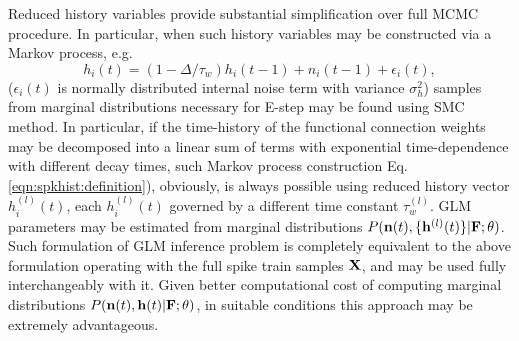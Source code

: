 Reduced history variables provide substantial simplification over full MCMC procedure. In particular, when such history variables may be constructed via a Markov process, e.g.
\begin{equation}\label{eqn:spkhist:definition}
h_i(t)=(1-\Delta/\tau_w) h_i(t-1) + n_i(t-1) + \epsilon_i(t), 
\end{equation}
($\epsilon_i(t)$ is normally distributed internal noise term with variance $\sigma^2_h$) samples from marginal distributions necessary for E-step may be found using SMC method. In particular, if the time-history of the  functional connection weights may be decomposed into a linear sum of  terms with exponential time-dependence with different decay times, such Markov process construction Eq. \eqref{eqn:spkhist:definition}), obviously, is always possible using reduced history vector $h_i^{(l)}(t)$, each $h_i^{(l)}(t)$ governed by a different time constant $\tau^{(l)}_w$. GLM parameters may be estimated from marginal distributions $P({\bf n}(t), \{{\bf h}^{(l)}(t)\}|{\bf F};\mathbf{\theta})$.  Such formulation of GLM inference problem is completely equivalent to the above formulation operating with the full spike train samples ${\bf X}$, and may be used fully interchangeably with it. Given better computational cost of computing marginal distributions $P({\bf n}(t), {\bf h}(t)|{\bf F};\mathbf{\theta})$, in suitable conditions this approach may be extremely advantageous. 

